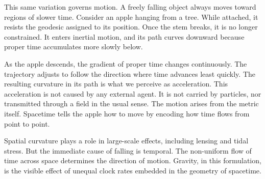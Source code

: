 This same variation governs motion. A freely falling object always moves toward regions of slower time. Consider an apple hanging from a tree. While attached, it resists the geodesic assigned to its position. Once the stem breaks, it is no longer constrained. It enters inertial motion, and its path curves downward because proper time accumulates more slowly below.

As the apple descends, the gradient of proper time changes continuously. The trajectory adjusts to follow the direction where time advances least quickly. The resulting curvature in its path is what we perceive as acceleration. This acceleration is not caused by any external agent. It is not carried by particles, nor transmitted through a field in the usual sense. The motion arises from the metric itself. Spacetime tells the apple how to move by encoding how time flows from point to point.

Spatial curvature plays a role in large-scale effects, including lensing and tidal stress. But the immediate cause of falling is temporal. The non-uniform flow of time across space determines the direction of motion. Gravity, in this formulation, is the visible effect of unequal clock rates embedded in the geometry of spacetime.


